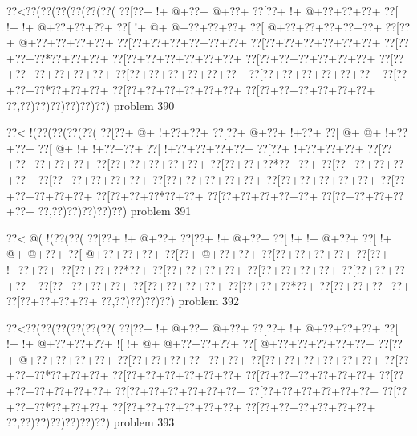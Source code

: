 \vbox{\vbox{\goo
\0??<\0??(\0??(\0??(\0??(\0??(\0??(
\0??[\0??+\- !+\- @+\0??+\- @+\0??+
\0??[\0??+\- !+\- @+\0??+\0??+\0??+
\0??[\- !+\- !+\- @+\0??+\0??+\0??+
\0??[\- !+\- @+\- @+\0??+\0??+\0??+
\0??[\- @+\0??+\0??+\0??+\0??+\0??+
\0??[\0??+\- @+\0??+\0??+\0??+\0??+
\0??[\0??+\0??+\0??+\0??+\0??+\0??+
\0??[\0??+\0??+\0??+\0??+\0??+\0??+
\0??[\0??+\0??+\0??*\0??+\0??+\0??+
\0??[\0??+\0??+\0??+\0??+\0??+\0??+
\0??[\0??+\0??+\0??+\0??+\0??+\0??+
\0??[\0??+\0??+\0??+\0??+\0??+\0??+
\0??[\0??+\0??+\0??+\0??+\0??+\0??+
\0??[\0??+\0??+\0??+\0??+\0??+\0??+
\0??[\0??+\0??+\0??*\0??+\0??+\0??+
\0??[\0??+\0??+\0??+\0??+\0??+\0??+
\0??[\0??+\0??+\0??+\0??+\0??+\0??+
\0??,\0??)\0??)\0??)\0??)\0??)\0??)
}
\hfil problem 390\hfil\break
}

\vbox{\vbox{\goo
\0??<\- !(\0??(\0??(\0??(\0??(
\0??[\0??+\- @+\- !+\0??+\0??+
\0??[\0??+\- @+\0??+\- !+\0??+
\0??[\- @+\- @+\- !+\0??+\0??+
\0??[\- @+\- !+\- !+\0??+\0??+
\0??[\- !+\0??+\0??+\0??+\0??+
\0??[\0??+\- !+\0??+\0??+\0??+
\0??[\0??+\0??+\0??+\0??+\0??+
\0??[\0??+\0??+\0??+\0??+\0??+
\0??[\0??+\0??+\0??*\0??+\0??+
\0??[\0??+\0??+\0??+\0??+\0??+
\0??[\0??+\0??+\0??+\0??+\0??+
\0??[\0??+\0??+\0??+\0??+\0??+
\0??[\0??+\0??+\0??+\0??+\0??+
\0??[\0??+\0??+\0??+\0??+\0??+
\0??[\0??+\0??+\0??*\0??+\0??+
\0??[\0??+\0??+\0??+\0??+\0??+
\0??[\0??+\0??+\0??+\0??+\0??+
\0??,\0??)\0??)\0??)\0??)\0??)
}
\hfil problem 391\hfil\break
}

\vbox{\vbox{\goo
\0??<\- @(\- !(\0??(\0??(
\0??[\0??+\- !+\- @+\0??+
\0??[\0??+\- !+\- @+\0??+
\0??[\- !+\- !+\- @+\0??+
\0??[\- !+\- @+\- @+\0??+
\0??[\- @+\0??+\0??+\0??+
\0??[\0??+\- @+\0??+\0??+
\0??[\0??+\0??+\0??+\0??+
\0??[\0??+\- !+\0??+\0??+
\0??[\0??+\0??+\0??*\0??+
\0??[\0??+\0??+\0??+\0??+
\0??[\0??+\0??+\0??+\0??+
\0??[\0??+\0??+\0??+\0??+
\0??[\0??+\0??+\0??+\0??+
\0??[\0??+\0??+\0??+\0??+
\0??[\0??+\0??+\0??*\0??+
\0??[\0??+\0??+\0??+\0??+
\0??[\0??+\0??+\0??+\0??+
\0??,\0??)\0??)\0??)\0??)
}
\hfil problem 392\hfil\break
}

\vbox{\vbox{\goo
\0??<\0??(\0??(\0??(\0??(\0??(\0??(
\0??[\0??+\- !+\- @+\0??+\- @+\0??+
\0??[\0??+\- !+\- @+\0??+\0??+\0??+
\0??[\- !+\- !+\- @+\0??+\0??+\0??+
\- ![\- !+\- @+\- @+\0??+\0??+\0??+
\0??[\- @+\0??+\0??+\0??+\0??+\0??+
\0??[\0??+\- @+\0??+\0??+\0??+\0??+
\0??[\0??+\0??+\0??+\0??+\0??+\0??+
\0??[\0??+\0??+\0??+\0??+\0??+\0??+
\0??[\0??+\0??+\0??*\0??+\0??+\0??+
\0??[\0??+\0??+\0??+\0??+\0??+\0??+
\0??[\0??+\0??+\0??+\0??+\0??+\0??+
\0??[\0??+\0??+\0??+\0??+\0??+\0??+
\0??[\0??+\0??+\0??+\0??+\0??+\0??+
\0??[\0??+\0??+\0??+\0??+\0??+\0??+
\0??[\0??+\0??+\0??*\0??+\0??+\0??+
\0??[\0??+\0??+\0??+\0??+\0??+\0??+
\0??[\0??+\0??+\0??+\0??+\0??+\0??+
\0??,\0??)\0??)\0??)\0??)\0??)\0??)
}
\hfil problem 393\hfil\break
}

